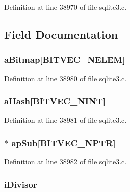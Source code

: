 Definition at line 38970 of file sqlite3.\+c.



\subsection{Field Documentation}
\hypertarget{struct_bitvec_a3beb6cc100dfa1a84191dae2bf1111a3}{}
\subsubsection[{a\+Bitmap}]{ a\+Bitmap\mbox{[}{\bf B\+I\+T\+V\+E\+C\+\_\+\+N\+E\+L\+E\+M}\mbox{]}}\label{struct_bitvec_a3beb6cc100dfa1a84191dae2bf1111a3}


Definition at line 38980 of file sqlite3.\+c.

\hypertarget{struct_bitvec_a07f34bff07a12239746401c393fdd1b6}{}
\subsubsection[{a\+Hash}]{ a\+Hash\mbox{[}{\bf B\+I\+T\+V\+E\+C\+\_\+\+N\+I\+N\+T}\mbox{]}}\label{struct_bitvec_a07f34bff07a12239746401c393fdd1b6}


Definition at line 38981 of file sqlite3.\+c.

\hypertarget{struct_bitvec_a8bfaacfefd1acea1a2cdb3c84b2ec443}{}
\subsubsection[{ap\+Sub}]{$\ast$ ap\+Sub\mbox{[}{\bf B\+I\+T\+V\+E\+C\+\_\+\+N\+P\+T\+R}\mbox{]}}\label{struct_bitvec_a8bfaacfefd1acea1a2cdb3c84b2ec443}


Definition at line 38982 of file sqlite3.\+c.

\hypertarget{struct_bitvec_af29bb9a512ce9ad608d5a29669e3eedf}{}
\subsubsection[{i\+Divisor}]{ i\+Divisor}\label{struct_bitvec_af29bb9a512ce9ad608d5a29669e3eedf}


